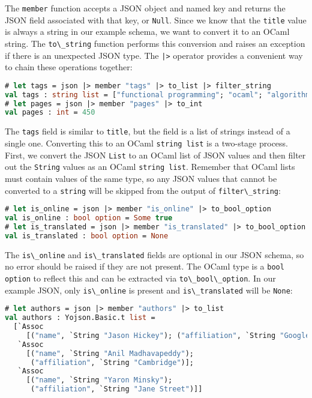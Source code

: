The \passthrough{\lstinline!member!} function accepts a JSON object and
named key and returns the JSON field associated with that key, or
\passthrough{\lstinline!Null!}. Since we know that the
\passthrough{\lstinline!title!} value is always a string in our example
schema, we want to convert it to an OCaml string. The
\passthrough{\lstinline!to\_string!} function performs this conversion
and raises an exception if there is an unexpected JSON type. The
\passthrough{\lstinline!|>!} operator provides a convenient way to chain
these operations {together}:

\begin{lstlisting}[language=Caml]
# let tags = json |> member "tags" |> to_list |> filter_string
val tags : string list = ["functional programming"; "ocaml"; "algorithms"]
# let pages = json |> member "pages" |> to_int
val pages : int = 450
\end{lstlisting}

The \passthrough{\lstinline!tags!} field is similar to
\passthrough{\lstinline!title!}, but the field is a list of strings
instead of a single one. Converting this to an OCaml
\passthrough{\lstinline!string list!} is a two-stage process. First, we
convert the JSON \passthrough{\lstinline!List!} to an OCaml list of JSON
values and then filter out the \passthrough{\lstinline!String!} values
as an OCaml \passthrough{\lstinline!string list!}. Remember that OCaml
lists must contain values of the same type, so any JSON values that
cannot be converted to a \passthrough{\lstinline!string!} will be
skipped from the output of \passthrough{\lstinline!filter\_string!}:

\begin{lstlisting}[language=Caml]
# let is_online = json |> member "is_online" |> to_bool_option
val is_online : bool option = Some true
# let is_translated = json |> member "is_translated" |> to_bool_option
val is_translated : bool option = None
\end{lstlisting}

The \passthrough{\lstinline!is\_online!} and
\passthrough{\lstinline!is\_translated!} fields are optional in our JSON
schema, so no error should be raised if they are not present. The OCaml
type is a \passthrough{\lstinline!bool option!} to reflect this and can
be extracted via \passthrough{\lstinline!to\_bool\_option!}. In our
example JSON, only \passthrough{\lstinline!is\_online!} is present and
\passthrough{\lstinline!is\_translated!} will be
\passthrough{\lstinline!None!}:

\begin{lstlisting}[language=Caml]
# let authors = json |> member "authors" |> to_list
val authors : Yojson.Basic.t list =
  [`Assoc
     [("name", `String "Jason Hickey"); ("affiliation", `String "Google")];
   `Assoc
     [("name", `String "Anil Madhavapeddy");
      ("affiliation", `String "Cambridge")];
   `Assoc
     [("name", `String "Yaron Minsky");
      ("affiliation", `String "Jane Street")]]
\end{lstlisting}

